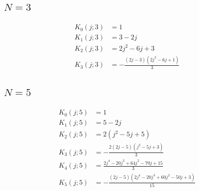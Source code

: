 \subsection{$N=3$}
\begin{align*}
K_{0}(j;3)&=1 \\
K_{1}(j;3)&=3 - 2 j \\
K_{2}(j;3)&=2 j^{2} - 6 j + 3 \\
K_{3}(j;3)&=- \frac{\left(2 j - 3\right) \left(2 j^{2} - 6 j + 1\right)}{3}
\end{align*}
\subsection{$N=5$}
\begin{align*}
K_{0}(j;5)&=1 \\
K_{1}(j;5)&=5 - 2 j \\
K_{2}(j;5)&=2 \left(j^{2} - 5 j + 5\right) \\
K_{3}(j;5)&=- \frac{2 \left(2 j - 5\right) \left(j^{2} - 5 j + 3\right)}{3} \\
K_{4}(j;5)&=\frac{2 j^{4} - 20 j^{3} + 64 j^{2} - 70 j + 15}{3} \\
K_{5}(j;5)&=- \frac{\left(2 j - 5\right) \left(2 j^{4} - 20 j^{3} + 60 j^{2} - 50 j + 3\right)}{15}
\end{align*}
